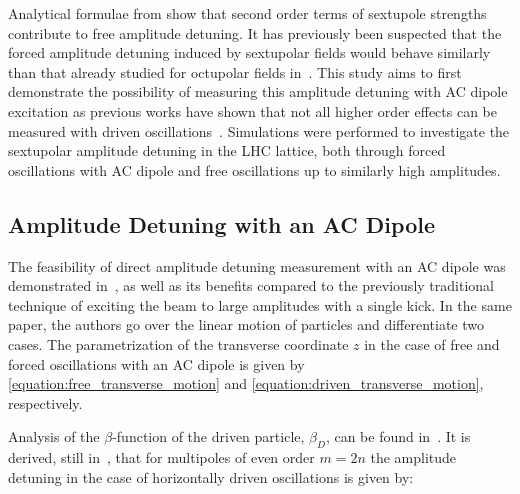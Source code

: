 Analytical formulae from \cite{REPORT:Bengtsson:Smear_Tune_Shift, BOOK:Lee:Accelerator_physics,BOOK:Chao:Handbook_Accelerator_Physics_Engineering} show that second order terms of sextupole strengths contribute to free amplitude detuning.
It has previously been suspected that the forced amplitude detuning induced by sextupolar fields would behave similarly than that already studied for octupolar fields in~\cite{PRAB:White:Direct_Amplitude_Detuning_AC_Dipole}.
This study aims to first demonstrate the possibility of measuring this amplitude detuning with AC dipole excitation as previous works have shown that not all higher order effects can be measured with driven oscillations~\cite{PRAB:Persson:Suppression_Amplitude_Dependent_Closest_Tune_Approach}.
Simulations were performed to investigate the sextupolar amplitude detuning in the LHC lattice, both through forced oscillations with AC dipole and free oscillations up to similarly high amplitudes.

\subsection*{Amplitude Detuning with an AC Dipole}

The feasibility of direct amplitude detuning measurement with an AC dipole was demonstrated in~\cite{PRAB:White:Direct_Amplitude_Detuning_AC_Dipole}, as well as its benefits compared to the previously traditional technique of exciting the beam to large amplitudes with a single kick.
In the same paper, the authors go over the linear motion of particles and differentiate two cases.
The parametrization of the transverse coordinate \(z\) in the case of free and forced oscillations with an AC dipole is given by \cref{equation:free_transverse_motion} and \cref{equation:driven_transverse_motion}, respectively.

Analysis of the \(\beta\)-function of the driven particle, \(\beta_D\), can be found in~\cite{PHD:Miyamoto,PRAB:Miyamoto:Parametrization_Driven_Betatron_Oscillation,PRAB:White:Direct_Amplitude_Detuning_AC_Dipole}.
It is derived, still in~\cite{PRAB:White:Direct_Amplitude_Detuning_AC_Dipole}, that for multipoles of even order \(m = 2n\) the amplitude detuning in the case of horizontally driven oscillations is given by:

